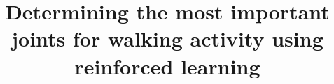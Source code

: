 \documentclass[review]{elsarticle}
\begin{document}
\begin{frontmatter}
	
	\title{Determining the most important joints for walking activity using reinforced learning}
	
	
	
\end{frontmatter}

	
	
\end{document}
